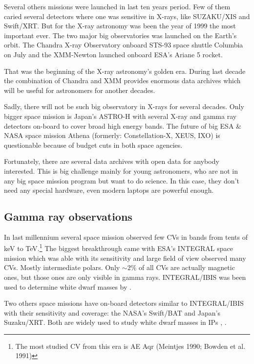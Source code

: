 \documentclass[oneside,a4paper,11pt]{report}
\begin{document}
Several others missions were launched in last ten years period. Few of them caried several 
detectors where one was sensitive in X-rays, like SUZAKU/XIS and Swift/XRT. But for the X-ray 
astronomy was been the year of 1999 the most important ever. The two major big observatories 
was launched on the Earth's orbit. The Chandra X-ray Observatory onboard STS-93 space shuttle 
Columbia on July and the XMM-Newton launched onboard ESA's Ariane 5 rocket.

   That was the beginning of the X-ray astronomy's golden era. During last decade the combination of 
Chandra and XMM provides enormous data archives which will be useful for astronomers for another 
decades. 

Sadly, there will not be such big observatory in X-rays for several decades. Only bigger space 
mission is Japan's ASTRO-H with several X-ray and gamma ray detectors on-board to cover broad 
high energy bands. The future of big ESA \& NASA space mission Athena (formerly: Constellation-X, 
XEUS, IXO)  is questionable because of budget cuts in both space agencies. 

Fortunately, there are several data archives with open data for anybody 
interested. This is big challenge mainly for young astronomers, who are 
not in any big space mission program but want to do science. In this case, 
they don't need any special hardware, even modern laptops are powerful enough.     



    
\subsection{Gamma ray observations}
In last millennium several space mission observed few CVs in bands from tents of keV to TeV.\footnote{The most 
studied CV from this era is AE Aqr (Meintjes 1990; Bowden et al. 1991)}
The biggest breakthrough came with ESA's INTEGRAL space mission which was able with its sensitivity 
and large field of view observed many CVs. Mostly intermediate polars. Only $\sim 2\%$ 
of all CVs are actually magnetic ones, but those ones are only visible in gamma rays.
INTEGRAL/IBIS was been used to determine white dwarf masses by \citet{2009MNRAS.392..630L}.

Two others space missions have on-board detectors similar to INTEGRAL/IBIS with their sensitivity 
and coverage: the NASA's Swift/BAT and Japan's Suzaku/XRT. Both are widely used to study white dwarf 
masses in IPs \citet{2009A&A...496..121B}, \citet{2010A&A...520A..25Y}.    
\end{document}
